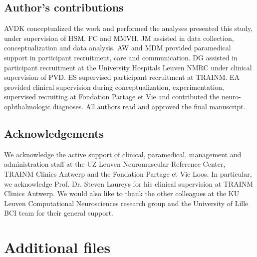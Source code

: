 \documentclass{article}
\begin{document}
\subsection*{Author's contributions}
AVDK conceptualized the work and performed the analyses
presented this study, under supervision of HSM, FC and MMVH.
JM assisted in data collection, conceptualization and data analysis.
AW and MDM provided paramedical support in participant recruitment,
care and communication.
DG assisted in participant recruitment at the University Hospitals Leuven NMRC under clinical supervision of PVD.
ES supervised participant recruitment at TRAINM.
EA provided clinical supervision during conceptualization, experimentation, supervised recruiting at Fondation Partage et Vie and contributed the neuro-ophthalmologic diagnoses.
All authors read and approved the final manuscript.

\subsection*{Acknowledgements}
We acknowledge the active support of clinical, paramedical, management and
administration staff at the UZ Leuven Neuromuscular Reference Center,
TRAINM Clinics Antwerp and the Fondation Partage et Vie Loos.
In particular, we acknowledge Prof. Dr. Steven Laureys for his clinical supervision
at TRAINM Clinics Antwerp.
We would also like to thank the other colleagues at the KU Leuven Computational
Neurosciences research group and the University of Lille BCI team
for their general support.

\section*{Additional files}
\end{document}
